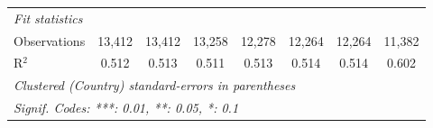 \begin{tabular}{lccccccc}
   \midrule \emph{Fit statistics}\\
   Observations                                                      & 13,412         & 13,412        & 13,258       & 12,278       & 12,264        & 12,264        & 11,382\\  
   R$^2$                                                             & 0.512          & 0.513         & 0.511        & 0.513        & 0.514         & 0.514         & 0.602\\  
   \midrule
   \multicolumn{8}{l}{\emph{Clustered (Country) standard-errors in parentheses}}\\
   \multicolumn{8}{l}{\emph{Signif. Codes: ***: 0.01, **: 0.05, *: 0.1}}\\
\end{tabular}
\par\endgroup


